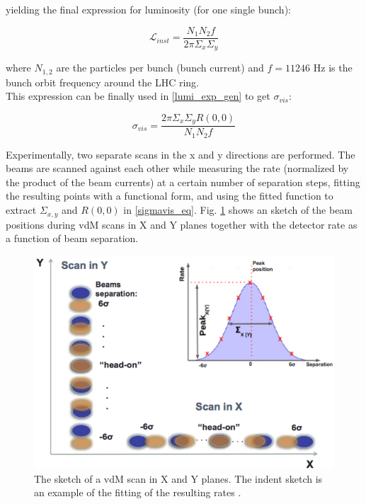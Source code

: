 yielding the final expression for luminosity (for one single bunch):

\begin{equation}
\mathcal{L}_{inst}=\frac{N_{1} N_{2}f}{2 \pi \Sigma_{x}\Sigma_{y}}
\end{equation}

where $N_{1,2}$ are the particles per bunch (bunch current) and  $f= 11246$ Hz is the bunch orbit frequency around the LHC ring.\\
This expression can be finally used in \ref{lumi_exp_gen} to get $\sigma_{vis}$:

\begin{equation}
  \sigma_{vis}=\frac{2\pi \Sigma_{x} \Sigma_{y} R(0, 0)}{N_{1}N_{2} f}
  \label{sigmavis_eq}
\end{equation}

Experimentally, two separate scans in the x and y directions are performed. The beams are scanned against each other  while measuring the rate (normalized by the product of the beam currents) at a certain number of separation steps, fitting the resulting points with a functional form, and using the fitted function to extract $\Sigma_{x,y}$ and $R(0,0)$ in \ref{sigmavis_eq}. Fig. \ref{vdm_sketch} shows an sketch of the beam positions during vdM scans in X and Y planes together with the detector rate as a function of beam separation.

\begin{center}
  \begin{figure}[ht]
    \centering
    \includegraphics[scale=.37]{Chapter3/vdm_sketch.png}
    \caption[Sketch of a vdM scan in X and Y planes and example of fitting resulting rates]{ The sketch of a vdM scan in X and Y planes. The indent sketch is an example of the fitting of the resulting rates \cite{vdM_sketch}.}
    \label{vdm_sketch}
  \end{figure}
\end{center}

